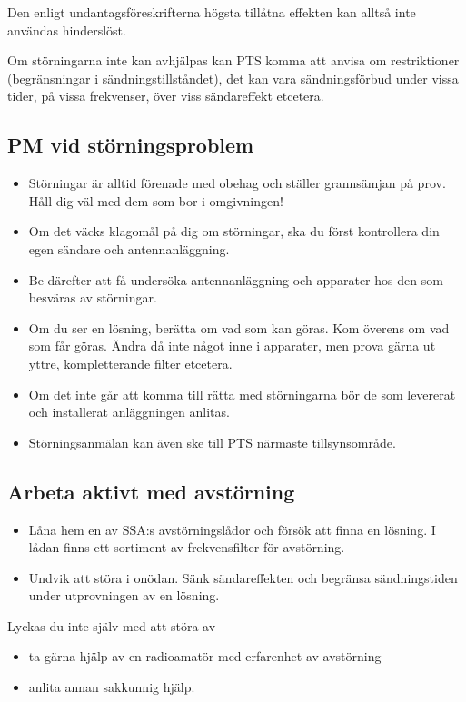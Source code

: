 Den enligt undantagsföreskrifterna högsta tillåtna effekten kan alltså inte
användas hinderslöst.

Om störningarna inte kan avhjälpas kan PTS komma att anvisa om restriktioner
(begränsningar i sändningstillståndet), det kan vara sändningsförbud under
vissa tider, på vissa frekvenser, över viss sändareffekt etcetera.

\subsection{PM vid störningsproblem}
\begin{itemize}
\item Störningar är alltid förenade med obehag och ställer grannsämjan på prov.
  Håll dig väl med dem som bor i omgivningen!
\item Om det väcks klagomål på dig om störningar, ska du först
  kontrollera din egen sändare och antennanläggning.
\item Be därefter att få undersöka antennanläggning och apparater hos
  den som besväras av störningar.
\item Om du ser en lösning, berätta om vad som kan göras.
  Kom överens om vad som får göras.
  Ändra då inte något inne i apparater, men prova gärna ut yttre,
  kompletterande filter etcetera.
\item Om det inte går att komma till rätta med störningarna bör de som
  levererat och installerat anläggningen anlitas.
\item Störningsanmälan kan även ske till PTS närmaste tillsynsområde.
\end{itemize}

\subsection{Arbeta aktivt med avstörning}
\begin{itemize}
\item Låna hem en av SSA:s avstörningslådor och försök att finna en lösning.
  I lådan finns ett sortiment av frekvensfilter för avstörning.
\item Undvik att störa i onödan.
  Sänk sändareffekten och begränsa sändningstiden under utprovningen av en
  lösning.
\end{itemize}

Lyckas du inte själv med att störa av
\begin{itemize}
\item ta gärna hjälp av en radioamatör med erfarenhet av avstörning
\item anlita annan sakkunnig hjälp.
\end{itemize}
